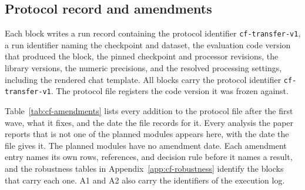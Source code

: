 \documentclass{article}
\begin{document}
\subsection{Protocol record and amendments}
\label{app:repro-protocol}

Each block writes a run record containing the protocol identifier \texttt{cf-transfer-v1}, a run identifier naming the checkpoint and dataset, the evaluation code version that produced the block, the pinned checkpoint and processor revisions, the library versions, the numeric precisions, and the resolved processing settings, including the rendered chat template. All \cfBlocks{} blocks carry the protocol identifier \texttt{cf-transfer-v1}. The protocol file registers the code version it was frozen against.

Table~\ref{tab:cf-amendments} lists every addition to the protocol file after the first wave, what it fixes, and the date the file records for it. Every analysis the paper reports that is not one of the planned modules appears here, with the date the file gives it. The \cfCoveragePlannedWord{} planned modules have no amendment date. Each amendment entry names its own rows, references, and decision rule before it names a result, and the robustness tables in Appendix~\ref{app:cf-robustness} identify the blocks that carry each one. A1 and A2 also carry the identifiers of the execution log.
\end{document}
